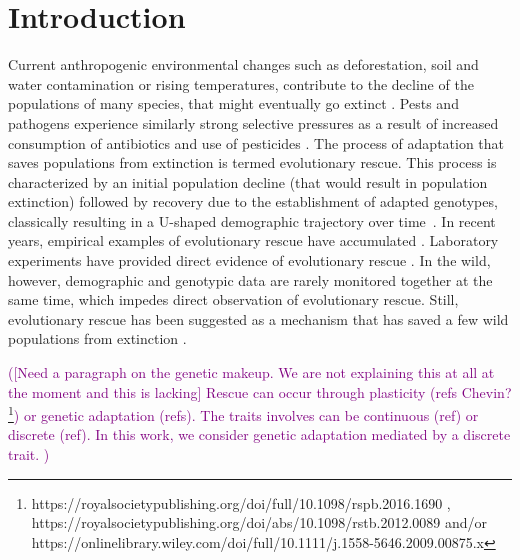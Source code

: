 \documentclass[11pt]{article}
\newcommand{\florence}[1]{\textcolor{purple}{(#1)}} %
\begin{document}

\newpage

\section*{Introduction}

Current anthropogenic environmental changes such as deforestation, soil and water contamination or rising temperatures, contribute to the decline of the populations of many species, that might eventually go extinct \citep{diniz_2019}. Pests and pathogens experience similarly strong selective pressures as a result of increased consumption of antibiotics and use of pesticides \citep{ramsayer_2013, kreiner_2018}. 
The process of adaptation that saves populations from extinction is termed evolutionary rescue. This process is characterized by an initial population decline (that would result in population extinction) followed by recovery due to the establishment of adapted genotypes, classically resulting in a U-shaped demographic trajectory over time~\citep{gomulkiewicz_1995}.
In recent years, empirical examples of evolutionary rescue have accumulated \citep[as reviewed by ][]{alexander_2014,carlson_2014,bell_2017}. Laboratory experiments have provided direct evidence of evolutionary rescue  \citep[e.g.][]{bell_2009, agashe_2011, lachapelle_2012, lindsey_2013, stelkens_2014}. In the wild, however, demographic and genotypic data are rarely monitored together at the same time, which impedes direct observation of evolutionary rescue. Still, evolutionary rescue has been suggested as a mechanism that has saved a few wild populations from extinction \citep[e.g.][]{vanderwal_2012, digiallonardo_2015, gignoux_2018}. 



\florence{[Need a paragraph on the genetic makeup. We are not explaining this at all at the moment and this is lacking] Rescue can occur through plasticity (refs Chevin? \footnote{https://royalsocietypublishing.org/doi/full/10.1098/rspb.2016.1690 , https://royalsocietypublishing.org/doi/abs/10.1098/rstb.2012.0089 and/or https://onlinelibrary.wiley.com/doi/full/10.1111/j.1558-5646.2009.00875.x}) or genetic adaptation (refs). The traits involves can be continuous (ref) or discrete (ref). In this work, we consider genetic adaptation mediated by a discrete trait. }
\end{document}
